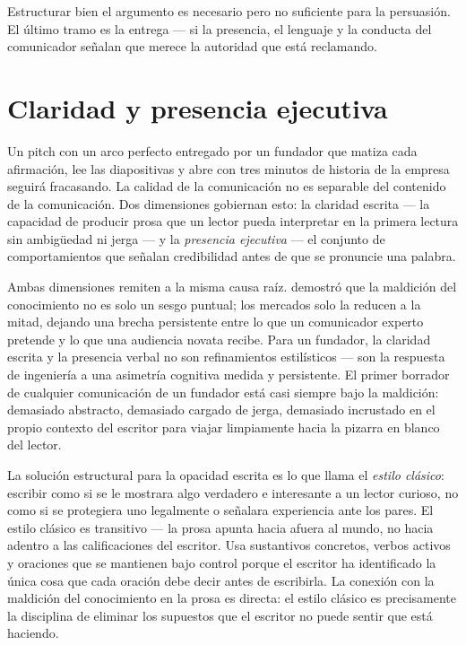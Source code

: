 Estructurar bien el argumento es necesario pero no suficiente para la persuasión. El último
tramo es la entrega — si la presencia, el lenguaje y la conducta del comunicador señalan que
merece la autoridad que está reclamando.

\section{Claridad y presencia ejecutiva}\label{sec:clarity-presence}

Un pitch con un arco perfecto entregado por un fundador que matiza cada afirmación, lee las
diapositivas y abre con tres minutos de historia de la empresa seguirá fracasando. La calidad
de la comunicación no es separable del contenido de la comunicación. Dos dimensiones gobiernan
esto: la claridad escrita — la capacidad de producir prosa que un lector pueda interpretar en
la primera lectura sin ambigüedad ni jerga — y la \emph{presencia ejecutiva} — el conjunto
de comportamientos que señalan credibilidad antes de que se pronuncie una palabra.

Ambas dimensiones remiten a la misma causa raíz. \textcite{camerer1989curse} demostró que la
maldición del conocimiento no es solo un sesgo puntual; los mercados solo la reducen a la
mitad, dejando una brecha persistente entre lo que un comunicador experto pretende y lo que
una audiencia novata recibe. %
Para un fundador, la claridad escrita y la presencia verbal no son refinamientos estilísticos
— son la respuesta de ingeniería a una asimetría cognitiva medida y persistente. El primer
borrador de cualquier comunicación de un fundador está casi siempre bajo la maldición: demasiado
abstracto, demasiado cargado de jerga, demasiado incrustado en el propio contexto del escritor
para viajar limpiamente hacia la pizarra en blanco del lector.

La solución estructural para la opacidad escrita es lo que \textcite{pinker2014senseofstyle}
llama el \emph{estilo clásico}: escribir como si se le mostrara algo verdadero e interesante
a un lector curioso, no como si se protegiera uno legalmente o señalara experiencia ante los
pares. El estilo clásico es transitivo — la prosa apunta hacia afuera al mundo, no hacia
adentro a las calificaciones del escritor. Usa sustantivos concretos, verbos activos y oraciones
que se mantienen bajo control porque el escritor ha identificado la única cosa que cada oración
debe decir antes de escribirla. La conexión con la maldición del conocimiento en la prosa es
directa: el estilo clásico es precisamente la disciplina de eliminar los supuestos que el
escritor no puede sentir que está haciendo.

